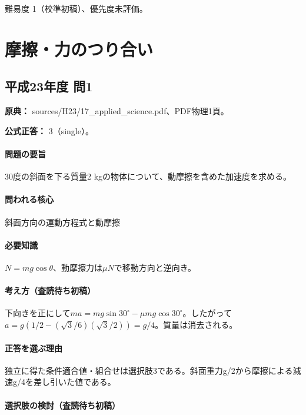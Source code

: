 \par 難易度 1（校準初稿）、優先度未評価。

\section{摩擦・力のつり合い}

\subsection{平成23年度 問1}
\label{q:h23-reg-applied-01}

\noindent\textbf{原典：} sources/H23/17\_applied\_science.pdf、PDF物理1頁。

\textbf{公式正答：} 3（single）。

\paragraph{問題の要旨} 30度の斜面を下る質量2 kgの物体について、動摩擦を含めた加速度を求める。

\paragraph{問われる核心} 斜面方向の運動方程式と動摩擦

\paragraph{必要知識} \(N=mg\cos\theta\)、動摩擦力は\(\mu N\)で移動方向と逆向き。

\paragraph{考え方（査読待ち初稿）} 下向きを正にして\(ma=mg\sin30^\circ-\mu mg\cos30^\circ\)。したがって\(a=g(1/2-(\sqrt3/6)(\sqrt3/2))=g/4\)。質量は消去される。

\paragraph{正答を選ぶ理由} 独立に得た条件適合値・組合せは選択肢3である。斜面重力g/2から摩擦による減速g/4を差し引いた値である。

\paragraph{選択肢の検討（査読待ち初稿）}\mbox{}\par

